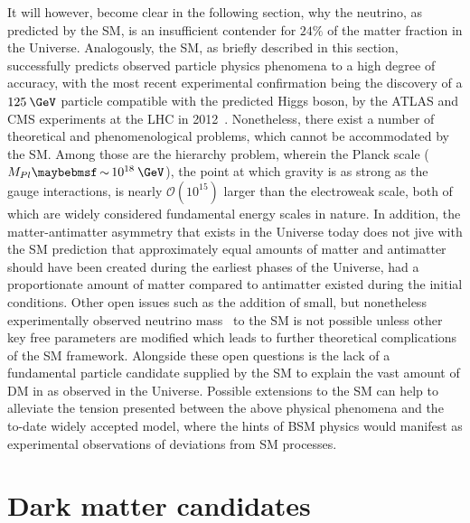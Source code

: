 It will however, become clear in the following section, why the neutrino, as predicted by the SM, is an insufficient contender for $24\%$ of the matter fraction in the Universe. Analogously, the SM, as briefly described in this section, successfully predicts observed particle physics phenomena to a high degree of accuracy, with the most recent experimental confirmation being the discovery of a $125\:\GeV$ particle compatible with the predicted Higgs boson, by the ATLAS and CMS experiments at the LHC in 2012~\cite{Aad:2012tfa,Chatrchyan:2012xdj}. Nonetheless, there exist a number of theoretical and phenomenological problems, which cannot be accommodated by the SM. Among those are the hierarchy problem, wherein the Planck scale ($M_{Pl} \sim 10^{18}\:\GeV$), the point at which gravity is as strong as the gauge interactions, is nearly $\mathcal{O}(10^{15})$ larger than the electroweak scale, both of which are widely considered fundamental energy scales in nature. In addition, the matter-antimatter asymmetry that exists in the Universe today does not jive with the SM prediction that approximately equal amounts of matter and antimatter should have been created during the earliest phases of the Universe, had a proportionate amount of matter compared to antimatter existed during the initial conditions. Other open issues such as the addition of small, but nonetheless experimentally observed neutrino mass~\cite{Feldman:2013vca} to the SM is not possible unless other key free parameters are modified which leads to further theoretical complications of the SM framework. Alongside these open questions is the lack of a fundamental particle candidate supplied by the SM to explain the vast amount of DM in as observed in the Universe. Possible extensions to the SM can help to alleviate the tension presented between the above physical phenomena and the to-date widely accepted model, where the hints of BSM physics would manifest as experimental observations of deviations from SM processes.

\section{Dark matter candidates}
\label{sec:DMcandidates}

